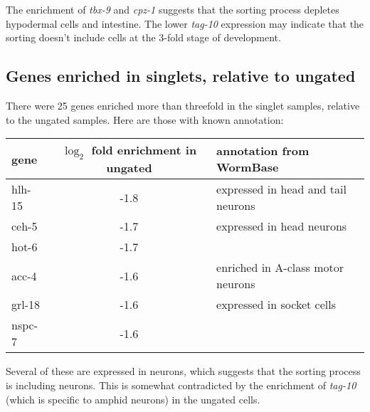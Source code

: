 \documentclass{article}
\begin{document}
The enrichment of {\em tbx-9}
and {\em cpz-1} suggests that the sorting process depletes hypodermal cells and
intestine. The lower {\em tag-10} expression may indicate that the sorting
doesn't include cells at the 3-fold stage of development.

\subsection*{Genes enriched in singlets, relative to ungated}

There were 25 genes enriched more than threefold in the singlet samples,
relative to the ungated samples. Here are those with known annotation:

\begin{tabular}{lcl}
gene & $\log_2$ fold enrichment in ungated & annotation from WormBase \\
\hline
hlh-15 & -1.8 & expressed in head and tail neurons \\
ceh-5 & -1.7 & expressed in head neurons \\
hot-6 & -1.7 &  \\
acc-4 & -1.6 & enriched in A-class motor neurons  \\
grl-18 & -1.6 & expressed in socket cells \\
nspc-7 & -1.6 &   \\
\end{tabular}

Several of these are expressed in neurons, which suggests that the
sorting process is including
neurons. This is somewhat contradicted by the enrichment of {\em tag-10}
(which is specific to amphid neurons)
in the ungated cells.
\end{document}
